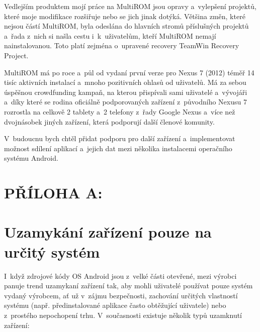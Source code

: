 \documentclass[12pt, a4paper, oneside]{article}
\begin{document}
Vedlejším produktem mojí práce na MultiROM jsou opravy a~vylepšení projektů, které moje modifikace rozšiřuje nebo se jich jinak dotýká. Většina změn, které nejsou částí MultiROM, byla odeslána do hlavních stromů příslušných projektů a~řada z~nich si našla cestu i~k~uživatelům, kteří MultiROM nemají nainstalovanou. Toto platí zejména o~upravené recovery TeamWin Recovery Project.

MultiROM má po roce a~půl od vydaní první verze pro Nexus 7 (2012) téměř 14 tisíc aktivních instalací a~mnoho pozitivních ohlasů od uživatelů. Má za sebou úspěšnou crowdfunding kampaň, na kterou přispívali sami uživatelé a~vývojáři a~díky které se rodina oficiálně podporovaných zařízení z~původního Nexusu 7 rozrostla na celkově 2 tablety a~2 telefony z~řady Google Nexus a~více než dvojnásobek jiných zařízení, která podporují další členové komunity.

V~budoucnu bych chtěl přidat podporu pro další zařízení a~implementovat možnost sdílení aplikací a~jejich dat mezi několika instalacemi operačního systému Android.

\newpage
\section*{PŘÍLOHA A:}
\section*{Uzamykání zařízení pouze na určitý systém}
\label{sec:locked}
I~když zdrojové kódy OS Android jsou z~velké části otevřené, mezi výrobci panuje trend uzamykaní zařízení tak, aby mohli uživatelé používat pouze systém vydaný výrobcem, ať už v~zájmu bezpečnosti, zachování určitých vlastností systému (např. předinstalované aplikace často obtěžující uživatele) nebo z~prostého nepochopení trhu. V~současnosti existuje několik typů uzamknutí zařízení:
\end{document}
